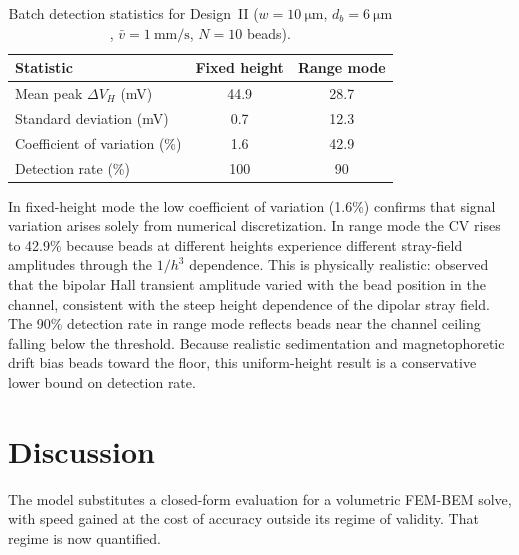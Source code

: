 \documentclass[pdflatex,sn-basic]{sn-jnl}
\theoremstyle{thmstyleone}
\theoremstyle{thmstyletwo}
\theoremstyle{thmstylethree}
\begin{document}
\begin{table}[!htbp]
\caption{Batch detection statistics for Design~II ($w = \SI{10}{\micro\meter}$, $d_b = \SI{6}{\micro\meter}$, $\bar{v} = \SI{1}{\milli\meter\per\second}$, $N = 10$ beads).}
\label{tab:batch}
\centering
\small
\begin{tabular}{lcc}
\toprule
Statistic & Fixed height & Range mode \\
\midrule
Mean peak $\Delta V_H$ (\si{\milli\volt}) & 44.9 & 28.7 \\
Standard deviation (\si{\milli\volt}) & 0.7 & 12.3 \\
Coefficient of variation (\%) & 1.6 & 42.9 \\
Detection rate (\%) & 100 & 90 \\
\bottomrule
\end{tabular}
\end{table}

In fixed-height mode the low coefficient of variation (1.6\%) confirms that signal variation arises solely from numerical discretization. In range mode the CV rises to 42.9\% because beads at different heights experience different stray-field amplitudes through the $1/h^3$ dependence. This is physically realistic: \citet{aledealat2009} observed that the bipolar Hall transient amplitude varied with the bead position in the channel, consistent with the steep height dependence of the dipolar stray field. The 90\% detection rate in range mode reflects beads near the channel ceiling falling below the threshold. Because realistic sedimentation and magnetophoretic drift bias beads toward the floor, this uniform-height result is a conservative lower bound on detection rate.

\section{Discussion}\label{sec:discussion}

The model substitutes a closed-form evaluation for a volumetric FEM-BEM solve, with speed gained at the cost of accuracy outside its regime of validity. That regime is now quantified.
\end{document}
